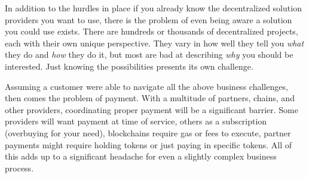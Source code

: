 \documentclass[11pt]{article}
\begin{document}
In addition to the hurdles in place if you already know the decentralized solution providers you want to use, there is the problem of even being aware a solution you could use exists. There are hundreds or thousands of decentralized projects, each with their own unique perspective. They vary in how well they tell you \textit{what} they do and \textit{how} they do it, but most are bad at describing \textit{why} you should be interested. Just knowing the possibilities presents its own challenge. 

Assuming a customer were able to navigate all the above business challenges, then comes the problem of payment. With a multitude of partners, chains, and other providers, coordinating proper payment will be a significant barrier. Some providers will want payment at time of service, others as a subscription (overbuying for your need), blockchains require gas or fees to execute, partner payments might require holding tokens or just paying in specific tokens. All of this adds up to a significant headache for even a slightly complex business process.  
\end{document}
